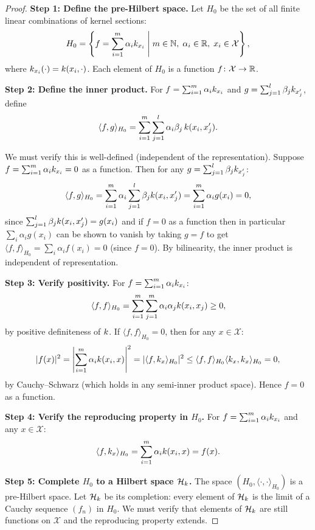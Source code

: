 \documentclass[11pt,a4paper]{article}
\begin{document}
\begin{proof}
\textbf{Step 1: Define the pre-Hilbert space.} Let $H_0$ be the
set of all finite linear combinations of kernel sections:
\[
H_0 = \left\{ f = \sum_{i=1}^m \alpha_i k_{x_i}
\;\middle|\; m \in \mathbb{N}, \; \alpha_i \in \mathbb{R}, \;
x_i \in \mathcal{X} \right\},
\]
where $k_{x_i}(\cdot) = k(x_i, \cdot)$. Each element
of $H_0$ is a function $f \colon \mathcal{X} \to \mathbb{R}$.

\textbf{Step 2: Define the inner product.} For $f = \sum_{i=1}^m
\alpha_i k_{x_i}$ and $g = \sum_{j=1}^l \beta_j
k_{x_j'}$, define
\begin{equation}
\label{eq:rkhs-inner-product}
\langle f, g \rangle_{H_0} = \sum_{i=1}^m \sum_{j=1}^l
\alpha_i \beta_j \, k(x_i, x_j').
\end{equation}

We must verify this is well-defined (independent of the
representation). Suppose $f = \sum_{i=1}^m \alpha_i k_{x_i}
= 0$ as a function. Then for any $g = \sum_{j=1}^l \beta_j
k_{x_j'}$:
\[
\langle f, g \rangle_{H_0} = \sum_{i=1}^m \alpha_i
\sum_{j=1}^l \beta_j k(x_i, x_j')
= \sum_{i=1}^m \alpha_i g(x_i) = 0,
\]
since $\sum_{j=1}^l \beta_j k(x_i, x_j') = g(x_i)$ and
if $f = 0$ as a function then in particular $\sum_{i} \alpha_i
g(x_i)$ can be shown to vanish by taking $g = f$ to get
$\langle f, f \rangle_{H_0} = \sum_{i} \alpha_i f(x_i) = 0$
(since $f = 0$). By bilinearity, the inner product is
independent of representation.

\textbf{Step 3: Verify positivity.} For $f = \sum_{i=1}^m
\alpha_i k_{x_i}$:
\[
\langle f, f \rangle_{H_0} = \sum_{i=1}^m \sum_{j=1}^m
\alpha_i \alpha_j k(x_i, x_j) \ge 0,
\]
by positive definiteness of $k$. If $\langle f, f
\rangle_{H_0} = 0$, then for any $x \in \mathcal{X}$:
\[
|f(x)|^2 = \left| \sum_{i=1}^m \alpha_i k(x_i, x)
\right|^2 = |\langle f, k_x \rangle_{H_0}|^2
\le \langle f, f \rangle_{H_0} \langle k_x,
k_x \rangle_{H_0} = 0,
\]
by Cauchy--Schwarz (which holds in any semi-inner product space).
Hence $f = 0$ as a function.

\textbf{Step 4: Verify the reproducing property in $H_0$.}
For $f = \sum_{i=1}^m \alpha_i k_{x_i}$ and any
$x \in \mathcal{X}$:
\[
\langle f, k_x \rangle_{H_0} = \sum_{i=1}^m \alpha_i
k(x_i, x) = f(x).
\]

\textbf{Step 5: Complete $H_0$ to a Hilbert space $\mathcal{H}_k$.}
The space $(H_0, \langle \cdot, \cdot \rangle_{H_0})$ is a
pre-Hilbert space. Let $\mathcal{H}_k$ be its completion: every element
of $\mathcal{H}_k$ is the limit of a Cauchy sequence $(f_n)$ in $H_0$.
We must verify that elements of $\mathcal{H}_k$ are still functions on
$\mathcal{X}$ and the reproducing property extends.


\end{proof}
\end{document}
